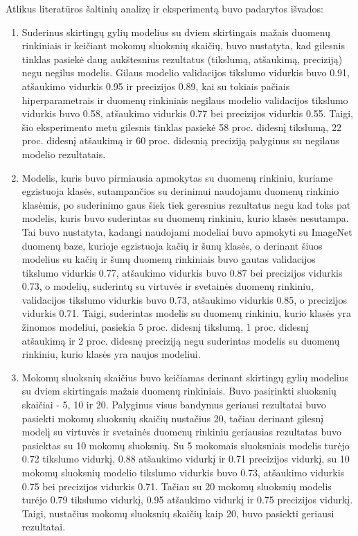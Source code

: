 \documentclass{VUMIFPSbakalaurinis}
\begin{document}
Atlikus literatūros šaltinių analizę ir eksperimentą buvo padarytos išvados:
\begin{enumerate}
  \item Suderinus skirtingų gylių modelius su dviem skirtingais mažais duomenų rinkiniais ir keičiant mokomų sluoksnių skaičių, buvo nustatyta, kad gilesnis tinklas pasiekė daug aukštesnius rezultatus (tikslumą, atšaukimą, preciziją) negu negilus modelis. Gilaus modelio validacijos tikslumo vidurkis buvo 0.91, atšaukimo vidurkis 0.95 ir precizijos 0.89, kai su tokiais pačiais hiperparametrais ir duomenų rinkiniais negilaus modelio validacijos tikslumo vidurkis buvo 0.58, atšaukimo vidurkis 0.77 bei precizijos vidurkis 0.55. Taigi, šio eksperimento metu gilesnis tinklas pasiekė 58 proc. didesnį tikslumą, 22 proc. didesnį atšaukimą ir 60 proc. didesnią preciziją palyginus su negilaus modelio rezultatais.
  \item Modelis, kuris buvo pirmiausia apmokytas su duomenų rinkiniu, kuriame egzistuoja klasės, sutampančios su derinimui naudojamu duomenų rinkinio klasėmis, po suderinimo gaus šiek tiek geresnius rezultatus negu kad toks pat modelis, kuris buvo suderintas su duomenų rinkiniu, kurio klasės nesutampa. Tai buvo nustatyta, kadangi naudojami modeliai buvo apmokyti su ImageNet duomenų baze, kurioje egzistuoja kačių ir šunų klasės, o derinant šiuos modelius su kačių ir šunų duomenų rinkiniais buvo gautas validacijos tikslumo vidurkis 0.77, atšaukimo vidurkis buvo 0.87 bei precizijos vidurkis 0.73, o modelių, suderintų su virtuvės ir svetainės duomenų rinkiniu, validacijos tikslumo vidurkis buvo 0.73, atšaukimo vidurkis 0.85, o precizijos vidurkis 0.71. Taigi, suderintas modelis su duomenų rinkiniu, kurio klasės yra žinomos modeliui, pasiekia 5 proc. didesnį tikslumą, 1 proc. didesnį atšaukimą ir 2 proc. didesnę preciziją negu suderintas modelis su duomenų rinkiniu, kurio klasės yra naujos modeliui.
  \item Mokomų sluoksnių skaičius buvo keičiamas derinant skirtingų gylių modelius su dviem skirtingais mažais duomenų rinkiniais. Buvo pasirinkti sluoksnių skaičiai - 5, 10 ir 20. Palyginus visus bandymus geriausi rezultatai buvo pasiekti mokomų sluoksnių skaičių nustačius 20, tačiau derinant gilesnį modelį su virtuvės ir svetainės duomenų rinkiniu geriausias rezultatas buvo pasiektas su 10 mokomų sluoksnių. Su 5 mokomais sluoksniais modelis turėjo 0.72 tikslumo vidurkį, 0.88 atšaukimo vidurkį ir 0.71 precizijos vidurkį, su 10 mokomų sluoksnių modelio tikslumo vidurkis buvo 0.73, atšaukimo vidurkis 0.75 bei precizijos vidurkis 0.71. Tačiau su 20 mokomų sluoksnių modelis turėjo 0.79 tikslumo vidurkį, 0.95 atšaukimo vidurkį ir 0.75 precizijos vidurkį. Taigi, nustačius mokomų sluoksnių skaičių kaip 20, buvo pasiekti geriausi rezultatai.
\end{enumerate}
\end{document}
